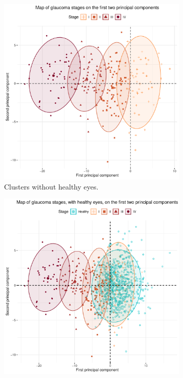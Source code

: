 \documentclass[jcm,article,submit,moreauthors,pdftex]{Definitions/mdpi}
\begin{document}
\begin{figure}
\centering
\begin{subfigure}[b]{0.49\textwidth}
\centering
\includegraphics[width=\textwidth]{img/map-clusters-whithout-healthy.pdf}
\caption{Clusters without healthy eyes.}
\label{fig:clusters-whithout-healty-eyes}
\end{subfigure}
\begin{subfigure}[b]{0.49\textwidth}
\centering
\includegraphics[width=\textwidth]{img/map-clusters-with-healthy.pdf}

\end{subfigure}
\end{figure}
\end{document}
